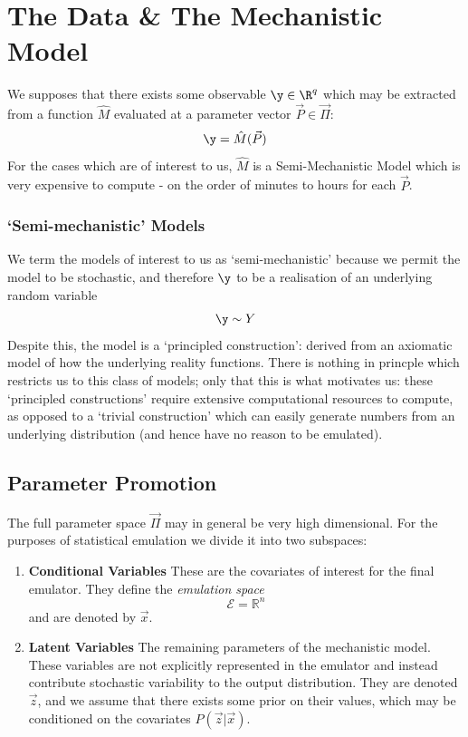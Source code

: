 \section{The Data \& The Mechanistic Model}
 
    We supposes that there exists some observable $\y \in \R^q$ which may be extracted from a function $\hat{M}$ evaluated at a parameter vector $\vec{P} \in \vec{\Pi}$:
    \begin{equation}
        \y = \hat{M}(\vec{P})
    \end{equation}
    For the cases which are of interest to us, $\hat{M}$ is a Semi-Mechanistic Model which is very expensive to compute - on the order of minutes to hours for each $\vec{P}$. 




    \subsubsection*{`Semi-mechanistic' Models}
        We term the models of interest to us as `semi-mechanistic' because we permit the model to be stochastic, and therefore $\y$ to be a realisation of an underlying random variable
        \[\y \sim Y\]
		Despite this, the model is a `principled construction': derived from an axiomatic model of how the underlying reality functions. There is nothing in princple which restricts us to this class of models; only that this is what motivates us: these `principled constructions' require extensive computational resources to compute, as opposed to a `trivial construction' which can easily generate numbers from an underlying distribution (and hence have no reason to be emulated). 



\subsection{Parameter Promotion}
        The full parameter space $\vec{\Pi}$ may in general be very high dimensional. For the purposes of statistical emulation we divide it into two subspaces:

        \begin{enumerate}
            \item \textbf{Conditional Variables} These are the covariates of interest for the final emulator. 
            They define the \emph{emulation space}
            \begin{equation}
                \mathcal{E} = \mathbb{R}^n
            \end{equation}
            and are denoted by $\vec{x}$.

            \item \textbf{Latent Variables} The remaining parameters of the mechanistic model. 
            These variables are not explicitly represented in the emulator and instead contribute stochastic variability to the output distribution. They are denoted $\vec{z}$, and we assume that there exists some prior on their values, which may be conditioned on the covariates $P(\vec{z} | \vec{x})$.
        \end{enumerate}



